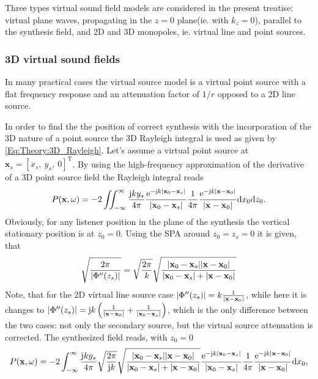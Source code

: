 \vspace{3mm}
Three types virtual sound field models are considered in the present treatise: virtual plane waves, propagating in the $z=0$ plane(ie. with $k_z = 0$), parallel to the synthesis field, and 2D and 3D monopoles, ie. virtual line and point sources.  

\subsubsection{3D virtual sound fields}

In many practical cases the virtual source model is a virtual point source with a flat frequency response and an attenuation factor of $1/r$ opposed to a 2D line source. 

In order to find the the position of correct synthesis with the incorporation of the 3D nature of a point source the 3D Rayleigh integral is used as given by \eqref{Eq:Theory:3D_Rayleigh}. Let's assume a virtual point source at $\mathbf{x}_s =  [x_s,\ y_s,\ 0]^{\mathrm{T}}$. By using the high-frequency approximation of the derivative of a 3D point source field the Rayleigh integral reads
\begin{equation}
P(\mathbf{x},\omega) = -2 \iint_{-\infty}^{\infty} \frac{\mathrm{j} k y_s}{4\pi} \frac{\mathrm{e}^{-\mathrm{j} k | \mathbf{x}_0 - \mathbf{x}_s | }}{|\mathbf{x}_0 - \mathbf{x}_s|} \frac{1}{4\pi} \frac{\mathrm{e}^{-\mathrm{j} k | \mathbf{x} - \mathbf{x}_0| }}{ | \mathbf{x} - \mathbf{x}_0| } \mathrm{d} x_0 \mathrm{d} z_0.
\end{equation}
Obviously, for any listener position in the plane of the synthesis the vertical stationary position is at $z_0=0$. Using the SPA around $z_0 = z_s = 0$ it is given, that
\begin{equation}
\sqrt{\frac{2\pi}{|\Phi''(z_s)|}} = \sqrt{\frac{2\pi}{ k }}\sqrt{\frac{| \mathbf{x}_0 - \mathbf{x}_s | | \mathbf{x} - \mathbf{x}_0|  }{| \mathbf{x}_0 - \mathbf{x}_s | + | \mathbf{x} - \mathbf{x}_0| }}
\end{equation}
Note, that for the 2D virtual line source case $|\Phi''(z_s)| = k \frac{1}{ |\mathbf{x} - \mathbf{x}_0| }$, while here it is changes to $|\Phi''(z_s)| = \mathrm{j} k \left( \frac{1}{| \mathbf{x} - \mathbf{x}_0|} + \frac{1}{ |\mathbf{x}_0 - \mathbf{x}_s |} \right)$, which is the only difference between the two cases: not only the secondary source, but the virtual source attenuation is corrected.
The synthesized field reads, with $z_0=0$
\begin{equation}
P(\mathbf{x},\omega) = -2 \int_{-\infty}^{\infty} \frac{\mathrm{j} k y_s}{4\pi} \sqrt{\frac{2\pi}{\mathrm{j} k}}\sqrt{\frac{| \mathbf{x}_0 - \mathbf{x}_s | | \mathbf{x} - \mathbf{x}_0|  }{| \mathbf{x}_0 - \mathbf{x}_s | + | \mathbf{x} - \mathbf{x}_0| }} \frac{\mathrm{e}^{-\mathrm{j} k | \mathbf{x}_0 - \mathbf{x}_s | }}{|\mathbf{x}_0 - \mathbf{x}_s|} \frac{1}{4\pi} \frac{\mathrm{e}^{-\mathrm{j} k | \mathbf{x} - \mathbf{x}_0| }}{ | \mathbf{x} - \mathbf{x}_0| } \mathrm{d} x_0,
\end{equation}	
